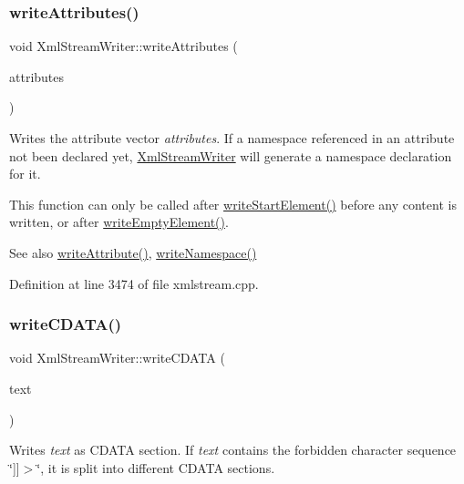 \subsubsection{\texorpdfstring{write\+Attributes()}{writeAttributes()}}
{\footnotesize\ttfamily void Xml\+Stream\+Writer\+::write\+Attributes (\begin{DoxyParamCaption}\item[{const \hyperlink{class_xml_stream_attributes}{Xml\+Stream\+Attributes} \&}]{attributes }\end{DoxyParamCaption})}

Writes the attribute vector {\itshape attributes}. If a namespace referenced in an attribute not been declared yet, \hyperlink{class_xml_stream_writer}{Xml\+Stream\+Writer} will generate a namespace declaration for it.

This function can only be called after \hyperlink{class_xml_stream_writer_aa001c660c1df012b4e37773aa219c379}{write\+Start\+Element()} before any content is written, or after \hyperlink{class_xml_stream_writer_a07e058f896327e9236e7c19132842cf2}{write\+Empty\+Element()}.

\begin{DoxySeeAlso}{See also}
\hyperlink{class_xml_stream_writer_a685d12dc71870e20e835085b6326787b}{write\+Attribute()}, \hyperlink{class_xml_stream_writer_ae04b7c7035435fd98cc625257776e732}{write\+Namespace()} 
\end{DoxySeeAlso}


Definition at line 3474 of file xmlstream.\+cpp.

\mbox{\label{class_xml_stream_writer_a812b894549f810c701ca3826acd9cc65}} 
\subsubsection{\texorpdfstring{write\+C\+D\+A\+T\+A()}{writeCDATA()}}
{\footnotesize\ttfamily void Xml\+Stream\+Writer\+::write\+C\+D\+A\+TA (\begin{DoxyParamCaption}\item[{const Q\+String \&}]{text }\end{DoxyParamCaption})}

Writes {\itshape text} as C\+D\+A\+TA section. If {\itshape text} contains the forbidden character sequence \char`\"{}\mbox{]}\mbox{]}$>$\char`\"{}, it is split into different C\+D\+A\+TA sections.

